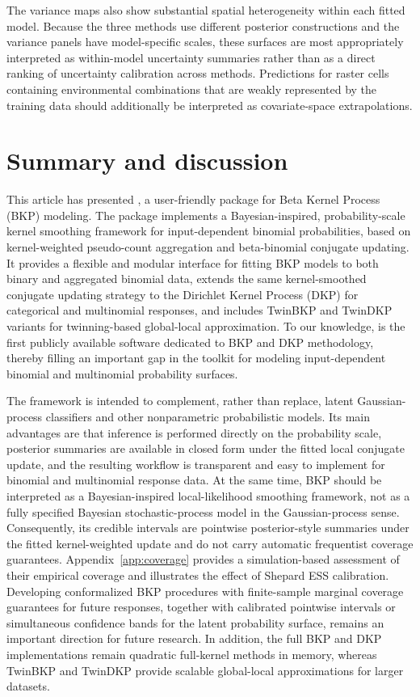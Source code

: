 \documentclass[article, shortnames]{jss}
\begin{document}
The variance maps also show substantial spatial heterogeneity within each fitted model.
Because the three methods use different posterior constructions and the variance panels have model-specific scales, these surfaces are most appropriately interpreted as within-model uncertainty summaries rather than as a direct ranking of uncertainty calibration across methods.
Predictions for raster cells containing environmental combinations that are weakly represented by the training data should additionally be interpreted as covariate-space extrapolations.


\FloatBarrier

\section{Summary and discussion} \label{sec:summary}

This article has presented , a user-friendly  package for Beta Kernel Process (BKP) modeling.
The package implements a Bayesian-inspired, probability-scale kernel smoothing framework for input-dependent binomial probabilities, based on kernel-weighted pseudo-count aggregation and beta-binomial conjugate updating.
It provides a flexible and modular interface for fitting BKP models to both binary and aggregated binomial data, extends the same kernel-smoothed conjugate updating strategy to the Dirichlet Kernel Process (DKP) for categorical and multinomial responses, and includes TwinBKP and TwinDKP variants for twinning-based global-local approximation.
To our knowledge,  is the first publicly available software dedicated to BKP and DKP methodology, thereby filling an important gap in the toolkit for modeling input-dependent binomial and multinomial probability surfaces.

The framework is intended to complement, rather than replace, latent Gaussian-process classifiers and other nonparametric probabilistic models.
Its main advantages are that inference is performed directly on the probability scale, posterior summaries are available in closed form under the fitted local conjugate update, and the resulting workflow is transparent and easy to implement for binomial and multinomial response data.
At the same time, BKP should be interpreted as a Bayesian-inspired local-likelihood smoothing framework, not as a fully specified Bayesian stochastic-process model in the Gaussian-process sense.
Consequently, its credible intervals are pointwise posterior-style summaries under the fitted kernel-weighted update and do not carry automatic frequentist coverage guarantees. Appendix~\ref{app:coverage} provides a simulation-based assessment of their empirical coverage and illustrates the effect of Shepard ESS calibration. Developing conformalized BKP procedures with finite-sample marginal coverage guarantees for future responses, together with calibrated pointwise intervals or simultaneous confidence bands for the latent probability surface, remains an important direction for future research.
In addition, the full BKP and DKP implementations remain quadratic full-kernel methods in memory, whereas TwinBKP and TwinDKP provide scalable global-local approximations for larger datasets.
\end{document}
